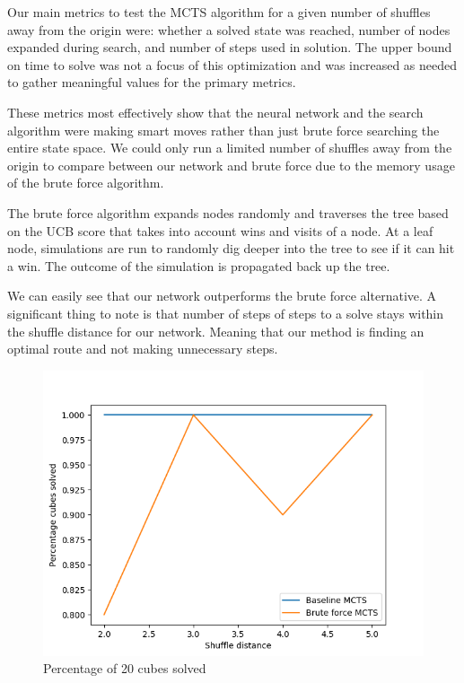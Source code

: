 \documentclass[10pt,twocolumn,letterpaper]{article}
\begin{document}
Our main metrics to test the MCTS algorithm for a given number of shuffles away from the origin were: whether a solved state was reached, number of nodes expanded during search, and number of steps used in solution.  The upper bound on time to solve was not a focus of this optimization and was increased as needed to gather meaningful values for the primary metrics.  

These metrics most effectively show that the neural network and the search algorithm were making smart moves rather than just brute force searching the entire state space.  We could only run a limited number of shuffles away from the origin to compare between our network and brute force due to the memory usage of the brute force algorithm.  

The brute force algorithm expands nodes randomly and traverses the tree based on the UCB score that takes into account wins and visits of a node.  At a leaf node, simulations are run to randomly dig deeper into the tree to see if it can hit a win.  The outcome of the simulation is propagated back up the tree. 

We can easily see that our network outperforms the brute force alternative.  A significant thing to note is that number of steps of steps to a solve stays within the shuffle distance for our network.  Meaning that our method is finding an optimal route and not making unnecessary steps. 

\begin{figure}
  \includegraphics[width=\linewidth]{brute_solved.png}
  \caption{Percentage of 20 cubes solved}
  \label{fig:net}
\end{figure}
\end{document}
